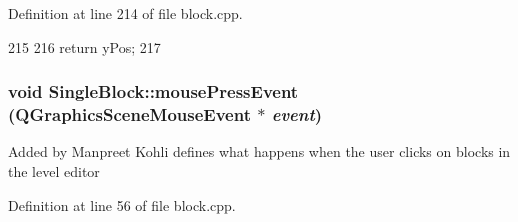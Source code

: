 Definition at line 214 of file block.cpp.


\begin{DoxyCode}
215 {
216     return yPos;
217 }
\end{DoxyCode}
\hypertarget{class_single_block_a9616ca814fe8e82b0ec9c7448d5b2415}{
\subsubsection[{mousePressEvent}]{\setlength{\rightskip}{0pt plus 5cm}void SingleBlock::mousePressEvent (QGraphicsSceneMouseEvent $\ast$ {\em event})}}
\label{class_single_block_a9616ca814fe8e82b0ec9c7448d5b2415}
Added by Manpreet Kohli defines what happens when the user clicks on blocks in the level editor 

Definition at line 56 of file block.cpp.


